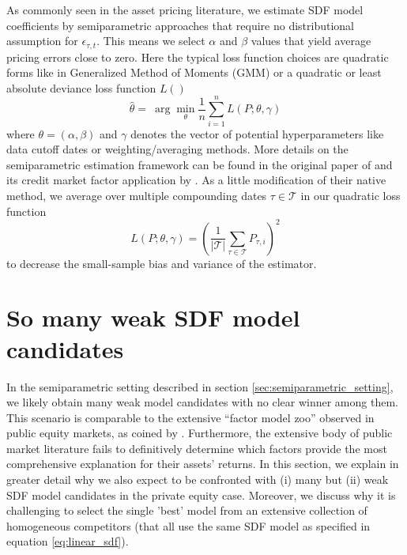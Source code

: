\documentclass[12pt]{article}
\begin{document}
As commonly seen in the asset pricing literature, we estimate SDF model coefficients by semiparametric approaches that require no distributional assumption for $\epsilon_{\tau,t}$.
This means we select $\alpha$ and $\beta$ values that yield average pricing errors close to zero. 
Here the typical loss function choices are quadratic forms like in Generalized Method of Moments (GMM) or a quadratic or least absolute deviance loss function $L()$
\begin{equation}
\label{eq:elastic_net}
\hat{\theta } = \
\arg \min_{\theta} \frac{1}{n} \sum_{i=1}^n L \left( P ; \theta, \gamma \right)
\end{equation}
where $\theta=(\alpha,\beta)$ and $\gamma$ denotes the vector of potential hyperparameters like data cutoff dates or weighting/averaging methods.
More details on the semiparametric estimation framework can be found in the original paper of \cite{DLP12} and its credit market factor application by \cite{HSS23}.
As a little modification of their native method, we average over multiple compounding dates $\tau \in \mathcal{T}$ in our quadratic loss function
\begin{equation}
	\label{eq:quadratic_loss}
	L \left( P ; \theta, \gamma \right) = \left( \frac{1}{|\mathcal{T}|} \sum_{\tau \in \mathcal{T}} P_{\tau,i}  \right)^2
\end{equation}
to decrease the small-sample bias and variance of the estimator.


\section{So many weak SDF model candidates}
\label{sec:model_selection}

In the semiparametric setting described in section \ref{sec:semiparametric_setting}, we likely obtain many weak model candidates with no clear winner among them.
This scenario is comparable to the extensive ``factor model zoo'' observed in public equity markets, as coined by \cite{C11,FGX20}. Furthermore, the extensive body of public market literature fails to definitively determine which factors provide the most comprehensive explanation for their assets' returns.
In this section, we explain in greater detail why we also expect to be confronted with (i) many but (ii) weak SDF model candidates in the private equity case.
Moreover, we discuss why it is challenging to select the single 'best' model from an extensive collection of homogeneous competitors (that all use the same SDF model as specified in equation \ref{eq:linear_sdf}).
\end{document}
